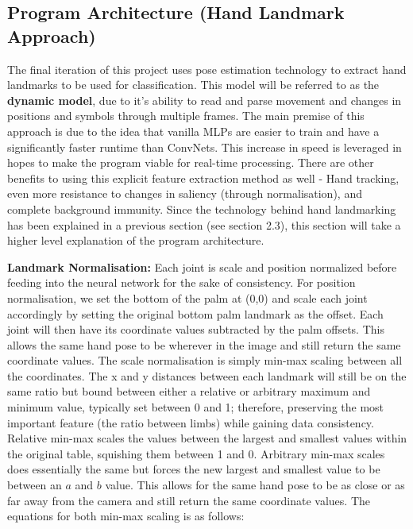 \documentclass[11pt]{article}
\def\paraskip{\vskip 0.4cm}
\begin{document}
    \subsection{Program Architecture (Hand Landmark Approach)}
        The final iteration of this project uses pose estimation technology to extract hand landmarks to be used for classification. This model will be referred to as the \textbf{dynamic model}, due to it's ability to read and parse movement and changes in positions and symbols through multiple frames. The main premise of this approach is due to the idea that vanilla MLPs are easier to train and have a significantly faster runtime than ConvNets. This increase in speed is leveraged in hopes to make the program viable for real-time processing. There are other benefits to using this explicit feature extraction method as well - Hand tracking, even more resistance to changes in saliency (through normalisation), and complete background immunity. Since the technology behind hand landmarking has been explained in a previous section (see section 2.3), this section will take a higher level explanation of the program architecture.

        \paraskip

        \noindent\textbf{Landmark Normalisation: } Each joint is scale and position normalized before feeding into the neural network for the sake of consistency. For position normalisation, we set the bottom of the palm at (0,0) and scale each joint accordingly by setting the original bottom palm landmark as the offset. Each joint will then have its coordinate values subtracted by the palm offsets. This allows the same hand pose to be wherever in the image and still return the same coordinate values. The scale normalisation is simply min-max scaling between all the coordinates. The x and y distances between each landmark will still be on the same ratio but bound between either a relative or arbitrary maximum and minimum value, typically set between 0 and 1; therefore, preserving the most important feature (the ratio between limbs) while gaining data consistency. Relative min-max scales the values between the largest and smallest values within the original table, squishing them between 1 and 0. Arbitrary min-max scales does essentially the same but forces the new largest and smallest value to be between an $a$ and $b$ value. This allows for the same hand pose to be as close or as far away from the camera and still return the same coordinate values. The equations for both min-max scaling is as follows:
\end{document}
